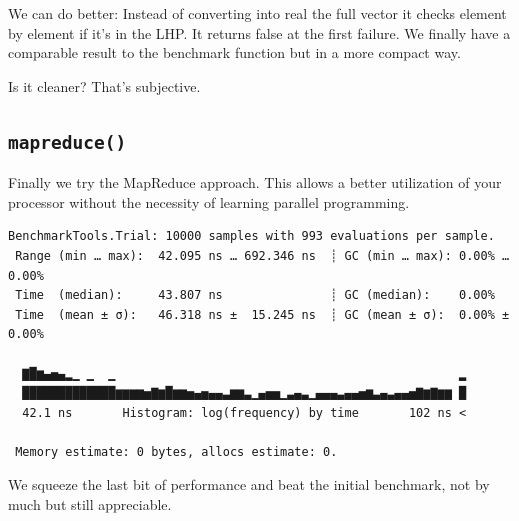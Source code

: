 \documentclass[
  a4paper,
  DIV=11,
  numbers=noendperiod]{scrreprt}
\newenvironment{Shaded}{\begin{snugshade}}{\end{snugshade}}
\newcommand{\FloatTok}[1]{\textcolor[rgb]{0.68,0.00,0.00}{#1}}
\newcommand{\FunctionTok}[1]{\textcolor[rgb]{0.28,0.35,0.67}{#1}}
\newcommand{\NormalTok}[1]{\textcolor[rgb]{0.00,0.23,0.31}{#1}}
\newcommand{\OperatorTok}[1]{\textcolor[rgb]{0.37,0.37,0.37}{#1}}
\newcommand{\PreprocessorTok}[1]{\textcolor[rgb]{0.68,0.00,0.00}{#1}}
\begin{document}
We can do better: Instead of converting into real the full vector it
checks element by element if it's in the LHP. It returns false at the
first failure. We finally have a comparable result to the benchmark
function but in a more compact way.

Is it cleaner? That's subjective.

\subsection{\texorpdfstring{\texttt{mapreduce()}}{mapreduce()}}\label{mapreduce}

Finally we try the MapReduce approach. This allows a better utilization
of your processor without the necessity of learning parallel
programming.

\begin{Shaded}
\end{Shaded}

\begin{verbatim}
BenchmarkTools.Trial: 10000 samples with 993 evaluations per sample.
 Range (min … max):  42.095 ns … 692.346 ns  ┊ GC (min … max): 0.00% … 0.00%
 Time  (median):     43.807 ns               ┊ GC (median):    0.00%
 Time  (mean ± σ):   46.318 ns ±  15.245 ns  ┊ GC (mean ± σ):  0.00% ± 0.00%

  ▇█▆▄▅▄▂▁ ▁  ▁                                                ▂
  █████████████▆▆▆▆▅▇▆█▆▆▅▄▅▄▄▃▆▆▃▁▄▅▅▁▃▄▃▁▄▄▄▃▄▄▅▆▃▄▃▄▄▅▇▆▇▆▆ █
  42.1 ns       Histogram: log(frequency) by time       102 ns <

 Memory estimate: 0 bytes, allocs estimate: 0.
\end{verbatim}

We squeeze the last bit of performance and beat the initial benchmark,
not by much but still appreciable.
\end{document}

